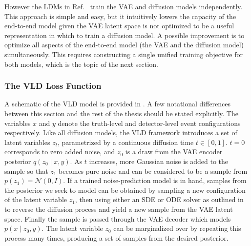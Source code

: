 However the LDMs in Ref.~\cite{rombach2022high} train the VAE and diffusion models independently.
This approach is simple and easy, but it intuitively lowers the capacity of the end-to-end model given the VAE latent space is not optimized to be a useful representation in which to train a diffusion model.
A possible improvement is to optimize all aspects of the end-to-end model (the VAE and the diffusion model) simultaneously.
This requires constructing a single unified training objective for both models, which is the topic of the next section.

\subsubsection{The VLD Loss Function}

A schematic of the VLD model is provided in .
A few notational differences between this section and the rest of the thesis should be stated explicitly.
The variables $x$ and $y$ denote the truth-level and detector-level event configurations respectively.
Like all diffusion models, the VLD framework introduces a set of latent variables $z_t$, parametrized by a continuous diffusion time $t \in [0, 1]$.
$t = 0$ corresponds to zero added noise, and $z_0$ is a draw from the VAE encoder posterior $q(z_0 \mid x, y)$.
As $t$ increases, more Gaussian noise is added to the sample so that $z_1$ becomes pure noise and can be considered to be a sample from $p(z_1) = \mathcal{N}(0, I)$.
If a trained noise-prediction model is in hand, samples from the posterior we seek to model can be obtained by sampling a new configuration of the latent variable $z_1$, then using either an SDE or ODE solver as outlined in  to reverse the diffusion process and yield a new sample from the VAE latent space.
Finally the sample is passed through the VAE decoder which models $p(x \mid z_0, y)$.
The latent variable $z_0$ can be marginalized over by repeating this process many times, producing a set of samples from the desired posterior.

